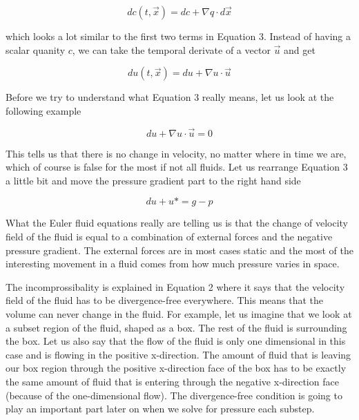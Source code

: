 \begin{equation}
dc(t,\vec{x}) = dc + \nabla q \cdot d\vec{x}
\end{equation}

which looks a lot similar to the first two terms in Equation 3. Instead of having a scalar quanity $c$, we can take the temporal derivate of a vector $\vec{u}$ and get 

\begin{equation}
du(t,\vec{x}) = du + \nabla u \cdot \vec{u}
\end{equation}

Before we try to understand what Equation 3 really means, let us look at the following example

\begin{equation}
du + \nabla u \cdot \vec{u} = 0
\end{equation}

This tells us that there is no change in velocity, no matter where in time we are, which of course is false for the most if not all fluids. Let us rearrange Equation 3 a little bit and move the pressure gradient part to the right hand side

\begin{equation}
du + u* = g - p
\end{equation}

What the Euler fluid equations really are telling us is that the change of velocity field of the fluid is equal to a combination of external forces and the negative pressure gradient. The external forces are in most cases static and the most of the interesting movement in a fluid comes from how much pressure varies in space. 

The incomprossibality is explained in Equation 2 where it says that the velocity field of the fluid has to be divergence-free everywhere. This means that the volume can never change in the fluid. For example, let us imagine that we look at a subset region of the fluid, shaped as a box. The rest of the fluid is surrounding the box. Let us also say that the flow of the fluid is only one dimensional in this case and is flowing in the positive x-direction. The amount of fluid that is leaving our box region through the positive x-direction face of the box has to be exactly the same amount of fluid that is entering through the negative x-direction face (because of the one-dimensional flow). The divergence-free condition is going to play an important part later on when we solve for pressure each substep.
